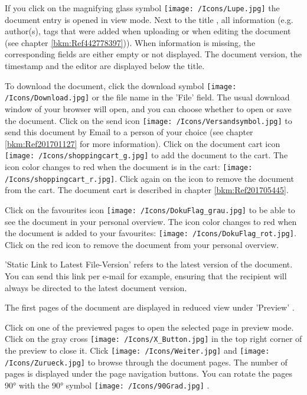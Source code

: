 If you click on the magnifying glass symbol \texttt{[image: /Icons/Lupe.jpg]} the document entry is opened in view mode. Next to the title , all information (e.g. author(s), tags that were added when uploading or when editing the document (see chapter \ref{bkm:Ref442778397})). When information is missing, the corresponding fields are either empty or not displayed. The document version, the timestamp and the editor  are displayed below the title. \newline

To download the document, click the download symbol \texttt{[image: /Icons/Download.jpg]} or the file name  in the 'File' field. The usual download window of your browser will open, and you can choose whether to open or save the document. Click on the send icon \texttt{[image: /Icons/Versandsymbol.jpg]}  to send this document by Email to a person of your choice (see chapter \ref{bkm:Ref201701127} for more information). Click on the document cart icon \texttt{[image: /Icons/shoppingcart\_g.jpg]}  to add the document to the cart. The icon color changes to red when the document is in the cart: \texttt{[image: /Icons/shoppingcart\_r.jpg]}. Click again on the icon to remove the document from the cart. The document cart is described in chapter \ref{bkm:Ref201705445}. \newline

Click on the favourites icon \texttt{[image: /Icons/DokuFlag\_grau.jpg]}  to be able to see the document in your personal overview. The icon color changes to red when the document is added to your favourites: \texttt{[image: /Icons/DokuFlag\_rot.jpg]}. Click on the red icon to remove the document from your personal overview. \newline

'Static Link to Latest File-Version'  refers to the latest version of the document. You can send this link per e-mail for example, ensuring that the recipient will always be directed to the latest document version.

The first pages of the document are displayed in reduced view under 'Preview' .

\vspace{\baselineskip}

Click on one of the previewed pages  to open the selected page in preview mode. Click on the gray cross \texttt{[image: /Icons/X\_Button.jpg]}  in the top right corner of the preview to close it. Click \texttt{[image: /Icons/Weiter.jpg]} and \texttt{[image: /Icons/Zurueck.jpg]}  to browse through the document pages. The number of pages  is displayed under the page navigation buttons. You can rotate the pages 90° with the 90° symbol \texttt{[image: /Icons/90Grad.jpg]} .

